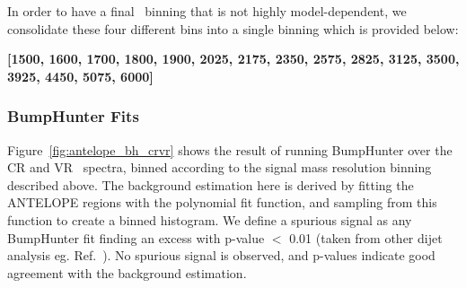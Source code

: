 In order to have a final \mt~binning that is not highly model-dependent, we consolidate these four different bins into a single binning which is provided below:

\textbf{[1500, 1600, 1700, 1800, 1900, 2025, 2175, 2350, 2575, 2825, 3125, 3500, 3925, 4450, 5075, 6000]}


\subsubsection{BumpHunter Fits}
\label{subsec:bhfits}

Figure~\ref{fig:antelope_bh_crvr} shows the result of running BumpHunter over the CR and VR \mt~spectra, binned according to the signal mass resolution binning described above. 
The background estimation here is derived by fitting the ANTELOPE regions with the polynomial fit function, and sampling from this function to create a binned histogram.
We define a spurious signal as any BumpHunter fit finding an excess with p-value $<$ 0.01 (taken from other dijet analysis eg. Ref.~\cite{ATLAS:2023azi}).
No spurious signal is observed, and p-values indicate good agreement with the background estimation.
